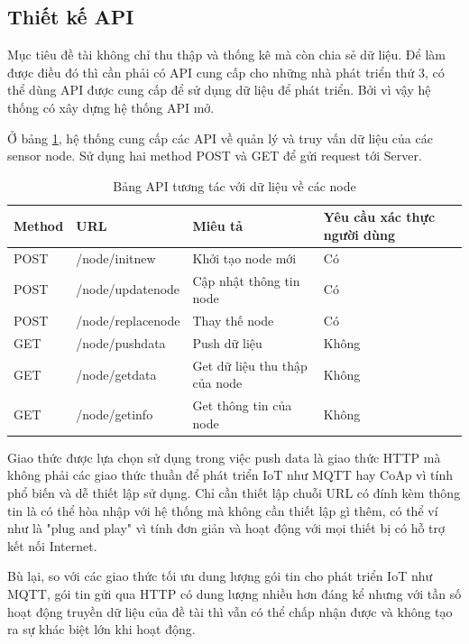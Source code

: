 \subsection{Thiết kế API}\label{sec: api}
Mục tiêu đề tài không chỉ thu thập và thống kê mà còn chia sẻ dữ liệu. Để làm được điều đó thì cần phải có API cung cấp cho những nhà phát triển thứ 3, có thể dùng API được cung cấp để sử dụng dữ liệu để phát triển. Bởi vì vậy hệ thống có xây dựng hệ thống API mở.

Ở bảng \ref{table: apilist}, hệ thống cung cấp các API về quản lý và truy vấn dữ liệu của các sensor node. Sử dụng hai method POST và GET để gửi request tới Server. 

\begin{table}[H]
	\centering
	\caption{Bảng API tương tác với dữ liệu về các node}
	\begin{tabular}{|l|l|l|l|}
		\hline
		Method & URL            & Miêu tả         & Yêu cầu xác thực người dùng        \\ \hline
		POST   & /node/initnew       & Khởi tạo node mới                & Có           \\ \hline
		POST   & /node/updatenode     & Cập nhật thông tin node & Có \\ \hline
		POST   & /node/replacenode       & Thay thế node  & Có       \\ \hline
		GET   & /node/pushdata & Push dữ liệu               &         Không                \\ \hline
		GET   & /node/getdata    & Get dữ liệu thu thập của node         &  Không      \\ \hline
		GET   & /node/getinfo   & Get thông tin của node & Không  \\ \hline
	\end{tabular}
	\label{table: apilist}
\end{table}

Giao thức được lựa chọn sử dụng trong việc push data là giao thức HTTP mà không phải các giao thức thuần để phát triển IoT như MQTT hay CoAp vì tính phổ biến và dễ thiết lập sử dụng. Chỉ cần thiết lập chuỗi URL có đính kèm thông tin là có thể hòa nhập với hệ thống mà không cần thiết lập gì thêm, có thể ví như là "plug and play" vì tính đơn giản và hoạt động với mọi thiết bị có hỗ trợ kết nối Internet.

Bù lại, so với các giao thức tối ưu dung lượng gói tin cho phát triển IoT như MQTT, gói tin gửi qua HTTP có dung lượng nhiều hơn đáng kể nhưng với tần số hoạt động truyền dữ liệu của đề tài thì vẫn có thể chấp nhận được và không tạo ra sự khác biệt lớn khi hoạt động.

